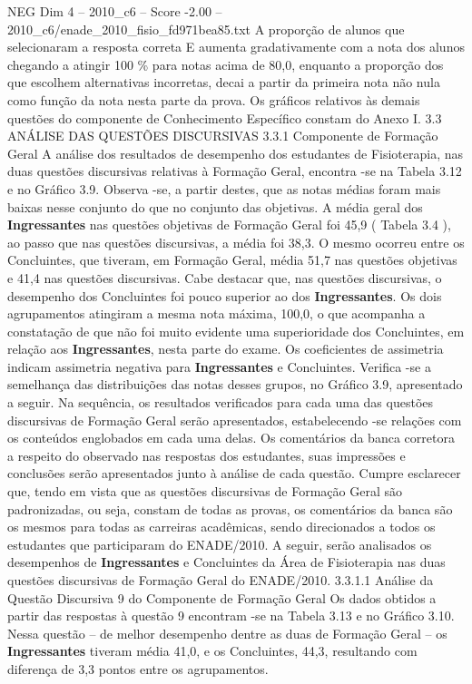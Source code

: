 \begin{textsample}{NEG Dim 4 – 2010\_c6 – Score -2.00 – 2010\_c6/enade\_2010\_fisio\_fd971bea85.txt}
A proporção de alunos que selecionaram a resposta correta E aumenta gradativamente com a nota dos alunos chegando a atingir 100 \% para notas acima de 80,0, enquanto a proporção dos que escolhem alternativas incorretas, decai a partir da primeira nota não nula como função da nota nesta parte da prova.
Os gráficos relativos às demais questões do componente de Conhecimento Específico constam do Anexo I. 3.3 ANÁLISE DAS QUESTÕES DISCURSIVAS 3.3.1 Componente de Formação Geral A análise dos resultados de desempenho dos estudantes de Fisioterapia, nas duas questões discursivas relativas à Formação Geral, encontra -se na Tabela 3.12 e no Gráfico 3.9.
Observa -se, a partir destes, que as notas médias foram mais baixas nesse conjunto do que no conjunto das objetivas.
A média geral dos \textbf{Ingressantes} nas questões objetivas de Formação Geral foi 45,9 ( Tabela 3.4 ), ao passo que nas questões discursivas, a média foi 38,3.
O mesmo ocorreu entre os Concluintes, que tiveram, em Formação Geral, média 51,7 nas questões objetivas e 41,4 nas questões discursivas.
Cabe destacar que, nas questões discursivas, o desempenho dos Concluintes foi pouco superior ao dos \textbf{Ingressantes}.
Os dois agrupamentos atingiram a mesma nota máxima, 100,0, o que acompanha a constatação de que não foi muito evidente uma superioridade dos Concluintes, em relação aos \textbf{Ingressantes}, nesta parte do exame.
Os coeficientes de assimetria indicam assimetria negativa para \textbf{Ingressantes} e Concluintes.
Verifica -se a semelhança das distribuições das notas desses grupos, no Gráfico 3.9, apresentado a seguir.
Na sequência, os resultados verificados para cada uma das questões discursivas de Formação Geral serão apresentados, estabelecendo -se relações com os conteúdos englobados em cada uma delas.
Os comentários da banca corretora a respeito do observado nas respostas dos estudantes, suas impressões e conclusões serão apresentados junto à análise de cada questão.
Cumpre esclarecer que, tendo em vista que as questões discursivas de Formação Geral são padronizadas, ou seja, constam de todas as provas, os comentários da banca são os mesmos para todas as carreiras acadêmicas, sendo direcionados a todos os estudantes que participaram do ENADE/2010.
A seguir, serão analisados os desempenhos de \textbf{Ingressantes} e Concluintes da Área de Fisioterapia nas duas questões discursivas de Formação Geral do ENADE/2010. 3.3.1.1 Análise da Questão Discursiva 9 do Componente de Formação Geral Os dados obtidos a partir das respostas à questão 9 encontram -se na Tabela 3.13 e no Gráfico 3.10.
Nessa questão – de melhor desempenho dentre as duas de Formação Geral – os \textbf{Ingressantes} tiveram média 41,0, e os Concluintes, 44,3, resultando com diferença de 3,3 pontos entre os agrupamentos.

\end{textsample}

